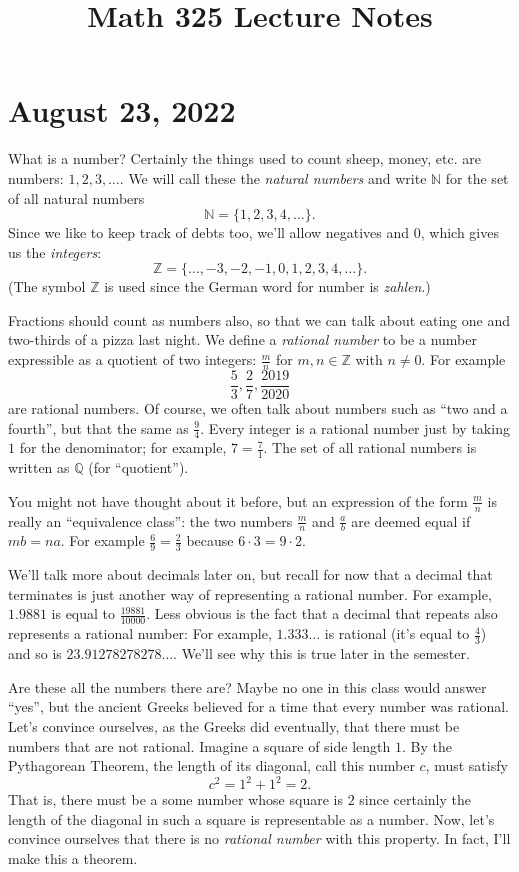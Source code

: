 \documentclass[12pt]{amsart}
\newcommand{\Q}{\mathbb{Q}}
\newcommand{\Z}{\mathbb{Z}}
\newcommand{\N}{\mathbb{N}}
\numberwithin{equation}{section}
\theoremstyle{plain} %
\newcommand{\Aug}[1]{\section{August #1, 2022}}
\theoremstyle{definition}
\theoremstyle{remark}
\begin{document}
\title{Math 325 Lecture Notes}



\Aug{23}


What is a number? Certainly the things used to count sheep, money, etc. are numbers:  $1, 2, 3, \dots$.
We will call these the {\em natural numbers}\index{$\N$} and 
write $\N$ for the set of all natural numbers
$$
\N = \{1, 2, 3, 4, \dots \}.
$$
Since we like to keep track of debts too, we'll allow negatives and $0$, which gives us the {\em integers}\index{$\Z$}:
$$
\Z = \{ \dots, -3, -2, -1, 0, 1, 2, 3, 4, \dots\}.
$$
(The symbol $\Z$ is used since the German word for number is {\em zahlen}.)


Fractions should count as numbers also, so that we can talk about eating one and two-thirds of a pizza last night. We define a {\em rational number} to be a number expressible
as a quotient of two integers: $\frac{m}{n}$ for $m,n \in \Z$ with $n \ne 0$. For example
$$
\frac{5}{3}, \frac27, \frac{2019}{2020}
$$
are rational numbers. Of course, we often talk about numbers such as
``two and a fourth'', but that the same as $\frac94$. Every integer
is a rational number just by taking $1$ for the denominator; for
example, $7 = \frac{7}{1}$. 
The set of all rational numbers is written as $\Q$ (for ``quotient'').\index{$\Q$} 

You might not have
thought about it before, but an expression of the form $\frac{m}{n}$ is really an ``equivalence class'': 
the two numbers $\frac{m}{n}$ and $\frac{a}{b}$ are deemed equal if $mb =
na$. For example $\frac69 = \frac23$ because $6 \cdot 3 = 9 \cdot 2$.



We'll talk more about decimals later on, but recall for now that a decimal that terminates is just another way of representing a rational number. For example,
$1.9881$ is equal to $\frac{19881}{10000}$. Less obvious is the fact that a decimal that repeats also represents a rational number: For example, 
$1.333\dots$ is rational (it's equal to $\frac43$) and so is 
$23.91278278278\dots$. We'll see why this is true later in the semester. 




Are these all the numbers there are? Maybe no one in this class  would answer ``yes'', but the ancient Greeks believed for a time that every number was rational. Let's convince
ourselves, as the Greeks did eventually, that there must be numbers that are not rational. Imagine a square of side length $1$. By the Pythagorean Theorem, the length of
its diagonal, call this number $c$, must satisfy 
$$
c^2 = 1^2 + 1^2 = 2.
$$
That is, there must be a some  number whose square is $2$ since certainly the length of the diagonal in such a square is representable as a number.  
Now, let's convince ourselves that there is no {\em rational number} with this property. In fact, I'll make this a theorem.
\end{document}
